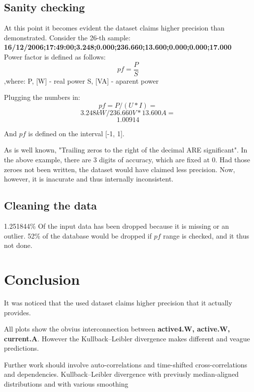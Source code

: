 \documentclass[11pt]{article}
\newcommand{\code}[1]{\textbf{#1}}
\newcommand{\para}[0]{\par\vspace{0.5cm}}
\begin{document}
\subsection{Sanity checking}
At this point it becomes evident the dataset claims higher precision than demonstrated.
Consider the 26-th sample: \code{16/12/2006;17:49:00;3.248;0.000;236.660;13.600;0.000;0.000;17.000}
Power factor is defined\cite{q6} as follows:
$$ {pf} = \frac{P}{S} $$
,where:  
P, [W] - real power  
S, [VA] - aparent power  

Plugging the numbers in:
$$ {pf} = P / (U * I) = $$
$$ 3.248kW / 236.660V * 13.600A = $$
$$ 1.00914 $$

And ${pf}$ is defined on the interval [-1, 1]\cite{q6}.
\para
As is well known,  "Trailing zeros to the right of the decimal ARE significant"\cite{q7}.
In the above example, there are 3 digits of accuracy, which are fixed at 0.
Had those zeroes not been written, the dataset would have claimed less precision.
Now, however, it is inacurate and thus internally inconsistent.

\subsection{Cleaning the data}
1.251844\% Of the input data has been dropped because it is missing or an outlier.
52\% of the database would be dropped if ${pf}$ range is checked, and it thus not done.

\section{Conclusion}
It was noticed that the used dataset claims higher precision that it actually provides.
\para
All plots show the obvius interconnection between \code{active4.W, active.W, current.A}.
However the Kullback–Leibler divergence makes different and veague predictions.
\para
Further work should involve auto-correlations and time-shifted cross-correlations and dependencies.
Kullback–Leibler divergence with previusly median-aligned distributions and with various smoothing
\end{document}
